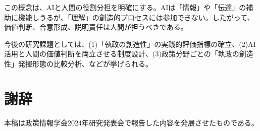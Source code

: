 \documentclass{keikaku}
\begin{document}
この概念は、AIと人間の役割分担を明確にする。AIは「情報」や「伝達」の補助に機能しうるが、「理解」の創造的プロセスには参加できない。したがって、価値判断、合意形成、説明責任は人間が担うべきである。

今後の研究課題としては、(1)「執政の創造性」の実践的評価指標の確立、(2)AI活用と人間の価値判断を両立させる制度設計、(3)政策分野ごとの「執政の創造性」発揮形態の比較分析、などが挙げられる。

\section*{謝辞}
本稿は政策情報学会2024年研究発表会で報告した内容を発展させたものである。

\end{document}
